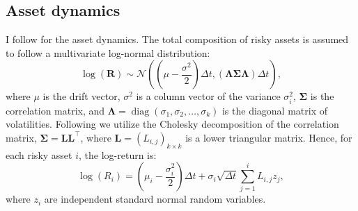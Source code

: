 \documentclass[11pt]{article}
\begin{document}
\subsection{Asset dynamics} \label{Subsection: Asset-dynamics}
I follow \textcite{CaiJuddXu2013} for the asset dynamics. The total composition of risky assets is assumed
to follow a multivariate log-normal distribution:
\begin{equation}\label{eq:Multivariate_Distribution}
   \log (\mathbf{R}) \sim \mathcal{N} \left( \left( \mu - \frac{\sigma^{2}}{2} \right) \Delta t , \left( \boldsymbol{\Lambda \Sigma \Lambda } \right) \Delta t \right),
\end{equation}
where \(\mu\) is the drift vector, \(\sigma^{2}\) is a column vector of the variance $\sigma^{2}_{i}$, \(\boldsymbol{\Sigma}\) is
the correlation matrix, and \(\boldsymbol{\Lambda} = \operatorname{diag}(\sigma_1 , \sigma_2 , \ldots , \sigma_k)\)
is the diagonal matrix of volatilities. Following \textcite{CaiJuddXu2013} we utilize the Cholesky decomposition of the correlation matrix,
\(\boldsymbol{\Sigma} = \mathbf{L} \mathbf{L}^\top\), where \(\mathbf{L} = (L_{i,j})_{k \times k}\) is a
lower triangular matrix. Hence, for each risky asset \(i\), the log-return is:
\begin{equation}\label{eq:Distribution_Single_Return}
  \log (R_i) = \left( \mu_i - \frac{\sigma_i^2}{2} \right) \Delta t + \sigma_i \sqrt{\Delta t} \sum_{j=1}^i L_{i,j} z_j,
\end{equation}
where \(z_i\) are independent standard normal random variables.
\end{document}
